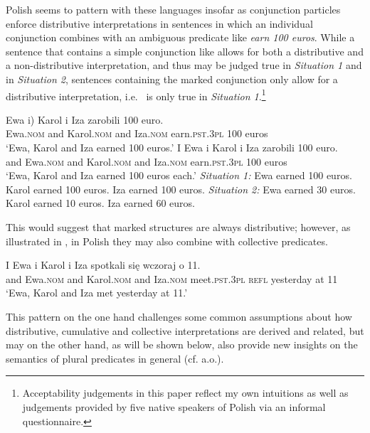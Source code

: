 \documentclass[output=paper]{langscibook}
\begin{document}
\noindent Polish seems to pattern with these languages insofar as conjunction particles enforce distributive interpretations in sentences in which an individual conjunction combines with an ambiguous predicate like \textit{earn 100 euros}. While a sentence that contains a simple conjunction like  allows for both a distributive and a non-distributive interpretation, and thus may be judged true in \textit{Situation 1} and in \textit{Situation 2}, sentences containing the marked conjunction only allow for a distributive interpretation, i.e.~ is only true in \textit{Situation 1}.\footnote{Acceptability judgements in this paper reflect my own intuitions as well as judgements provided by five native speakers of Polish via an informal questionnaire.}

\ea\label{ros:amb1} \gll Ewa \minsp{(} i) Karol i Iza zarobili 100 euro. \\
Ewa.\textsc{nom} {} and Karol.\textsc{nom} and Iza.\textsc{nom} earn.\textsc{pst.3pl} 100 euros \\
\glt `Ewa, Karol and Iza earned 100 euros.'
\ex\label{ros:amb2} \gll I Ewa i Karol i Iza zarobili 100 euro. \\
and Ewa.\textsc{nom} and Karol.\textsc{nom} and Iza.\textsc{nom} earn.\textsc{pst.3pl} 100 euros \\
\glt `Ewa, Karol and Iza earned 100 euros each.'
\ex
\ea \textit{Situation 1:} Ewa earned 100 euros. Karol earned 100 euros. Iza earned 100 euros.
\ex \textit{Situation 2:} Ewa earned 30 euros. Karol earned 10 euros. Iza earned 60 euros.
\z\z

\noindent This would suggest that marked structures are always distributive; however, as illustrated in , in Polish they may also combine with collective predicates.\largerpage

\ea\label{ros:coll} \gll I Ewa i Karol i Iza spotkali się wczoraj o 11. \\
and Ewa.\textsc{nom} and Karol.\textsc{nom} and Iza.\textsc{nom} meet.\textsc{pst.3pl} \textsc{refl} yesterday at 11 \\
\glt `Ewa, Karol and Iza met yesterday at 11.'
\z 

\noindent This pattern on the one hand challenges some common assumptions about how distributive, cumulative and collective interpretations are derived and related, but may on the other hand, as will be shown below, also provide new insights on the semantics of plural predicates in general (cf. \citealt{Dowty:1987, Schein:1993, Schein:2017, Winter:2002, Hackl:2002, Champollion:2010} a.o.).
\end{document}
